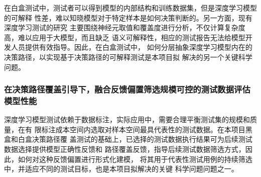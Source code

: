 在白盒测试中，测试者可以得到模型的内部结构和训练数据集，但是深度学习模型的可解释
性差，难以知晓模型对于特定样本是如何决策判断的。另一方面，现有深度学习测试的研究
主要围绕神经元取值和覆盖度进行分析，不仅计算复杂度高，难以应用于大模型，而且缺乏
语义可解释性，相应的测试报告无法给模型开发人员提供有效指导。因此，在白盒测试中，
如何分层抽象深度学习模型内在的决策路径，以实现基于决策路径的可解释测试是本项目拟
解决的另一个关键科学问题。

\subsubsection{在决策路径覆盖引导下，融合反馈偏置筛选规模可控的测试数据评估模型性能}

深度学习模型测试依赖于数据标注，实际应用中，需要合理平衡测试集的规模和质量，在有
限标注成本空间内选取对样本空间最具代表性的测试数据。在本项目黑盒和白盒决策路径覆
盖测试的基础上，已选择的测试数据执行结果可为后续测试数据选择提供模型正确性反馈和
路径覆盖反馈，指导后续测试数据筛选方式，因此，如何对这种反馈偏置进行形式化建模，
将其用于代表性测试用例的持续筛选中，并适应不同的测试目标，也是本项目拟解决的关键
科学问题问题之一。